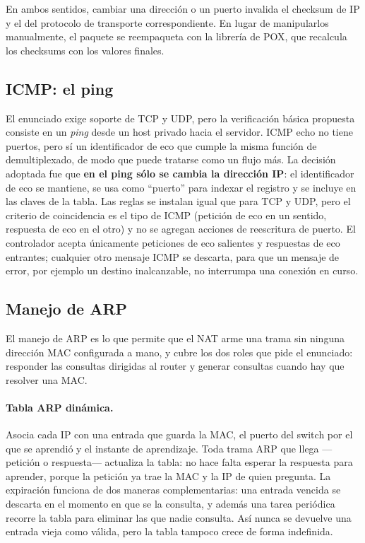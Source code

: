 ﻿\documentclass[10pt,a4paper]{article}
\begin{document}
En ambos sentidos, cambiar una dirección o un puerto invalida el checksum de IP y el
del protocolo de transporte correspondiente. En lugar de manipularlos manualmente, el
paquete se reempaqueta con la librería de POX, que recalcula los checksums con los
valores finales.

\subsection{ICMP: el ping}

El enunciado exige soporte de TCP y UDP, pero la verificación básica propuesta
consiste en un \emph{ping} desde un host privado hacia el servidor. ICMP echo no
tiene puertos, pero sí un identificador de eco que cumple la misma función de
demultiplexado, de modo que puede tratarse como un flujo más. La decisión adoptada
fue que \textbf{en el ping sólo se cambia la dirección IP}: el identificador de eco se
mantiene, se usa como ``puerto'' para indexar el registro y se incluye en las claves
de la tabla. Las reglas se instalan igual que para TCP y UDP, pero el criterio de
coincidencia es el tipo de ICMP (petición de eco en un sentido, respuesta de eco en
el otro) y no se agregan acciones de reescritura de puerto. El controlador acepta
únicamente peticiones de eco salientes y respuestas de eco entrantes; cualquier otro
mensaje ICMP se descarta, para que un mensaje de error, por ejemplo un destino
inalcanzable, no interrumpa una conexión en curso.

\subsection{Manejo de ARP}

El manejo de ARP es lo que permite que el NAT arme una trama sin ninguna dirección
MAC configurada a mano, y cubre los dos roles que pide el enunciado: responder las
consultas dirigidas al router y generar consultas cuando hay que resolver una MAC.

\paragraph{Tabla ARP dinámica.} Asocia cada IP con una entrada que guarda la MAC, el
puerto del switch por el que se aprendió y el instante de aprendizaje. Toda trama
ARP que llega ---petición o respuesta--- actualiza la tabla: no hace falta esperar la
respuesta para aprender, porque la petición ya trae la MAC y la IP de quien pregunta.
La expiración funciona de dos maneras complementarias: una entrada vencida se
descarta en el momento en que se la consulta, y además una tarea periódica recorre la
tabla para eliminar las que nadie consulta. Así nunca se devuelve una entrada vieja
como válida, pero la tabla tampoco crece de forma indefinida.
\end{document}
